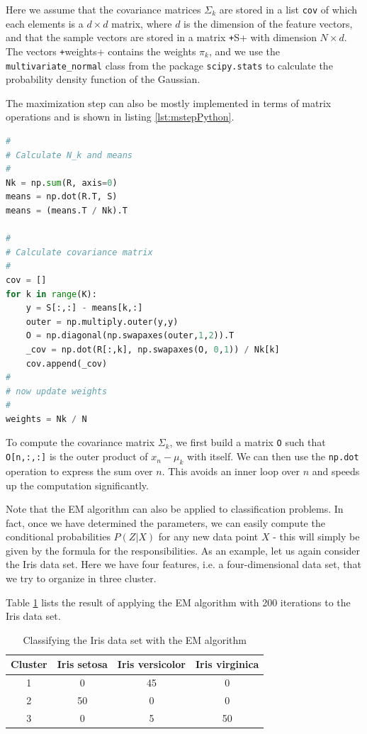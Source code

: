\documentclass[a4paper, draft]{article}
\theoremstyle{own}
\theoremstyle{remark}
\begin{document}
Here we assume that the covariance matrices $\Sigma_k$ are stored in a list \verb+cov+ of which each elements is a $d \times d$ matrix, where $d$ is the dimension of the feature vectors, and that the sample vectors are stored in a matrix \verb|+|S+ with dimension
$N \times d$. The vectors \verb|+|weights+ contains the weights $\pi_k$, and we use the 
\verb+multivariate_normal+ class from the package \verb+scipy.stats+ to calculate the probability density function of the Gaussian.

The maximization step can also be mostly implemented in terms of matrix operations and is shown in listing \ref{lst:mstepPython}. 

\begin{lstlisting}[frame=single,language=Python,label=lst:mstepPython, caption=Maximization step in Python,float=ht]
#
# Calculate N_k and means 
#
Nk = np.sum(R, axis=0)    
means = np.dot(R.T, S)
means = (means.T / Nk).T

#
# Calculate covariance matrix
#
cov = []        
for k in range(K):
    y = S[:,:] - means[k,:]
    outer = np.multiply.outer(y,y)
    O = np.diagonal(np.swapaxes(outer,1,2)).T
    _cov = np.dot(R[:,k], np.swapaxes(O, 0,1)) / Nk[k]
    cov.append(_cov)
# 
# now update weights
#
weights = Nk / N
\end{lstlisting}

To compute the covariance matrix $\Sigma_k$, we first build a matrix \verb|O| such that \verb|O[n,:,:]| is the outer product of $x_n - \mu_k$ with itself. We can then use
the \verb|np.dot| operation to express the sum over $n$. This avoids an inner loop over $n$ and speeds up the computation significantly.

Note that the EM algorithm can also be applied to classification problems. In fact, once we have determined the parameters, we can easily compute the conditional probabilities $P(Z | X)$ for any new data point $X$ - this will simply be given by the formula for the responsibilities. As an example, let us again consider the Iris data set. Here we have four features, i.e. a four-dimensional data set, that we try to organize in three cluster.

Table \ref{table:irisdataem} lists the result of applying the EM algorithm with 200 iterations to the Iris data set.

\begin{table}[ht]
	\centering
	\begin{tabular}{|c|c|c|c|}
	\hline 
	Cluster & Iris setosa & Iris versicolor & Iris virginica \\
	\hline
	1 & 0 & 45 & 0 \\
	2 & 50 & 0 & 0 \\
	3 & 0 & 5 & 50 \\
	\hline
	\end{tabular}
	\caption{Classifying the Iris data set with the EM algorithm}
	\label{table:irisdataem}
\end{table}
\end{document}
